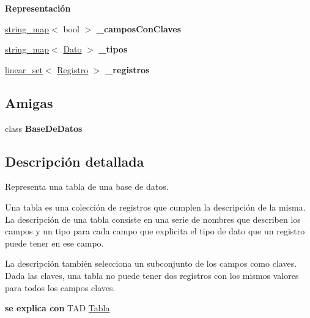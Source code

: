 \begin{Indent}{\bf Representación}
\begin{DoxyCompactItemize}
\item 
\hypertarget{classTabla_a0e970177b597f95dfe1450f944b3afca}{\hyperlink{classstring__map}{string\+\_\+map}$<$ bool $>$ {\bfseries \+\_\+campos\+Con\+Claves}}\label{classTabla_a0e970177b597f95dfe1450f944b3afca}

\item 
\hypertarget{classTabla_a68c1a6d7e0cbbf944a523636473ae775}{\hyperlink{classstring__map}{string\+\_\+map}$<$ \hyperlink{classDato}{Dato} $>$ {\bfseries \+\_\+tipos}}\label{classTabla_a68c1a6d7e0cbbf944a523636473ae775}

\item 
\hypertarget{classTabla_a28b3aa83e48d95fbeb5a6308a58defcc}{\hyperlink{classlinear__set}{linear\+\_\+set}$<$ \hyperlink{classRegistro}{Registro} $>$ {\bfseries \+\_\+registros}}\label{classTabla_a28b3aa83e48d95fbeb5a6308a58defcc}

\end{DoxyCompactItemize}
\end{Indent}
\subsection*{Amigas}
\begin{DoxyCompactItemize}
\item 
\hypertarget{classTabla_af1e840dbc460e53fa421d03b2da138e4}{class {\bfseries Base\+De\+Datos}}\label{classTabla_af1e840dbc460e53fa421d03b2da138e4}

\end{DoxyCompactItemize}


\subsection{Descripción detallada}
Representa una tabla de una base de datos. 

Una tabla es una colección de registros que cumplen la descripción de la misma. La descripción de una tabla consiste en una serie de nombres que describen los campos y un tipo para cada campo que explicita el tipo de dato que un registro puede tener en ese campo.

La descripción también selecciona un subconjunto de los campos como  claves. Dada las claves, una tabla no puede tener dos registros con los mismos valores para todos los campos claves.

{\bfseries se explica con} T\+A\+D \hyperlink{classTabla}{Tabla} 

